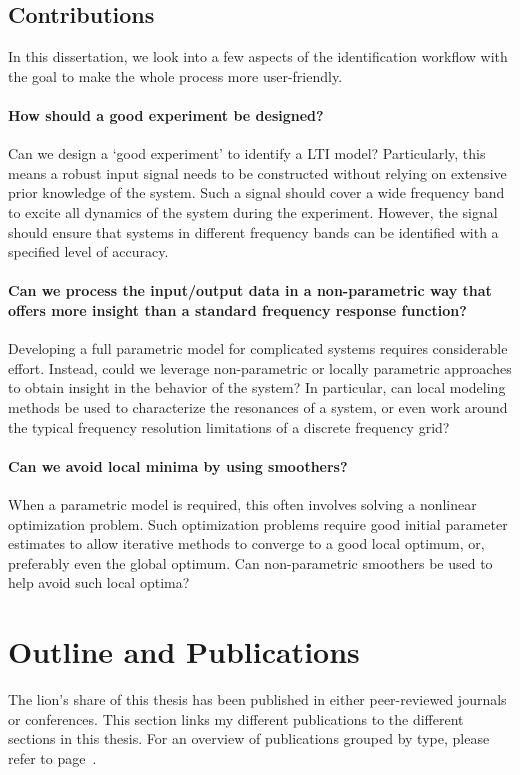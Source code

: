 \subsection{Contributions}
In this dissertation, we look into a few aspects of the identification workflow with the goal to make the whole process more user-friendly.

\paragraph{How should a good experiment be designed?}
Can we design a `good experiment' to identify a \gls{LTI} model?
Particularly, this means a robust input signal needs to be constructed without relying on extensive prior knowledge of the system.
Such a signal should cover a wide frequency band to excite all dynamics of the system during the experiment.
However, the signal should ensure that systems in different frequency bands can be identified with a specified level of accuracy.

\paragraph{Can we process the input/output data in a non-parametric way that offers more insight than a standard frequency response function?}
Developing a full parametric model for complicated systems requires considerable effort.
Instead, could we leverage non-parametric or locally parametric approaches to obtain insight in the behavior of the system?
In particular, can local modeling methods be used to characterize the resonances of a system, or even work around the typical frequency resolution limitations of a discrete frequency grid?

\paragraph{Can we avoid local minima by using smoothers?}
When a parametric model is required, this often involves solving a nonlinear optimization problem.
Such optimization problems require good initial parameter estimates to allow iterative methods to converge to a good local optimum, or, preferably even the global optimum.
Can non-parametric smoothers be used to help avoid such local optima?


\section{Outline and Publications}
   The lion's share of this thesis has been published in either peer-reviewed  journals or conferences.
   This section links my different publications to the different sections in this thesis.
   For an overview of publications grouped by type, please refer to page~\pageref{publicationList}.

